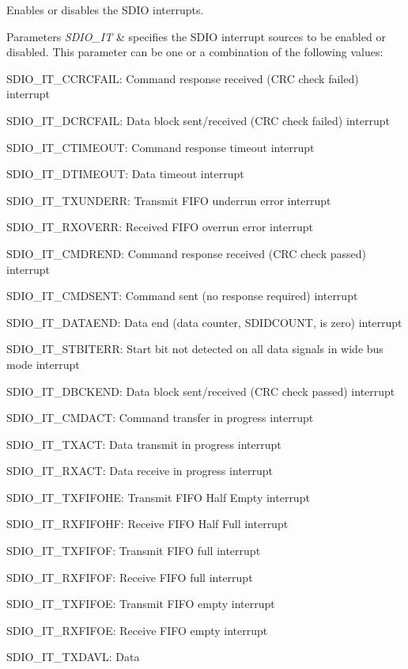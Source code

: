 Enables or disables the S\+D\+IO interrupts. 


\begin{DoxyParams}{Parameters}
{\em S\+D\+I\+O\+\_\+\+IT} & specifies the S\+D\+IO interrupt sources to be enabled or disabled. This parameter can be one or a combination of the following values\+: \begin{DoxyItemize}
\item S\+D\+I\+O\+\_\+\+I\+T\+\_\+\+C\+C\+R\+C\+F\+A\+IL\+: Command response received (C\+RC check failed) interrupt \item S\+D\+I\+O\+\_\+\+I\+T\+\_\+\+D\+C\+R\+C\+F\+A\+IL\+: Data block sent/received (C\+RC check failed) interrupt \item S\+D\+I\+O\+\_\+\+I\+T\+\_\+\+C\+T\+I\+M\+E\+O\+UT\+: Command response timeout interrupt \item S\+D\+I\+O\+\_\+\+I\+T\+\_\+\+D\+T\+I\+M\+E\+O\+UT\+: Data timeout interrupt \item S\+D\+I\+O\+\_\+\+I\+T\+\_\+\+T\+X\+U\+N\+D\+E\+RR\+: Transmit F\+I\+FO underrun error interrupt \item S\+D\+I\+O\+\_\+\+I\+T\+\_\+\+R\+X\+O\+V\+E\+RR\+: Received F\+I\+FO overrun error interrupt \item S\+D\+I\+O\+\_\+\+I\+T\+\_\+\+C\+M\+D\+R\+E\+ND\+: Command response received (C\+RC check passed) interrupt \item S\+D\+I\+O\+\_\+\+I\+T\+\_\+\+C\+M\+D\+S\+E\+NT\+: Command sent (no response required) interrupt \item S\+D\+I\+O\+\_\+\+I\+T\+\_\+\+D\+A\+T\+A\+E\+ND\+: Data end (data counter, S\+D\+I\+D\+C\+O\+U\+NT, is zero) interrupt \item S\+D\+I\+O\+\_\+\+I\+T\+\_\+\+S\+T\+B\+I\+T\+E\+RR\+: Start bit not detected on all data signals in wide bus mode interrupt \item S\+D\+I\+O\+\_\+\+I\+T\+\_\+\+D\+B\+C\+K\+E\+ND\+: Data block sent/received (C\+RC check passed) interrupt \item S\+D\+I\+O\+\_\+\+I\+T\+\_\+\+C\+M\+D\+A\+CT\+: Command transfer in progress interrupt \item S\+D\+I\+O\+\_\+\+I\+T\+\_\+\+T\+X\+A\+CT\+: Data transmit in progress interrupt \item S\+D\+I\+O\+\_\+\+I\+T\+\_\+\+R\+X\+A\+CT\+: Data receive in progress interrupt \item S\+D\+I\+O\+\_\+\+I\+T\+\_\+\+T\+X\+F\+I\+F\+O\+HE\+: Transmit F\+I\+FO Half Empty interrupt \item S\+D\+I\+O\+\_\+\+I\+T\+\_\+\+R\+X\+F\+I\+F\+O\+HF\+: Receive F\+I\+FO Half Full interrupt \item S\+D\+I\+O\+\_\+\+I\+T\+\_\+\+T\+X\+F\+I\+F\+OF\+: Transmit F\+I\+FO full interrupt \item S\+D\+I\+O\+\_\+\+I\+T\+\_\+\+R\+X\+F\+I\+F\+OF\+: Receive F\+I\+FO full interrupt \item S\+D\+I\+O\+\_\+\+I\+T\+\_\+\+T\+X\+F\+I\+F\+OE\+: Transmit F\+I\+FO empty interrupt \item S\+D\+I\+O\+\_\+\+I\+T\+\_\+\+R\+X\+F\+I\+F\+OE\+: Receive F\+I\+FO empty interrupt \item S\+D\+I\+O\+\_\+\+I\+T\+\_\+\+T\+X\+D\+A\+VL\+: Data 
\end{DoxyItemize}
\end{DoxyParams}
